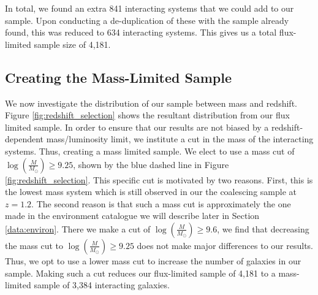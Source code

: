 In total, we found an extra 841 interacting systems that we could add to our sample. Upon conducting a de-duplication of these with the sample already found, this was reduced to 634 interacting systems. This gives us a total flux-limited sample size of 4,181.

\subsection{Creating the Mass-Limited Sample}
\noindent We now investigate the distribution of our sample between mass and redshift. Figure \ref{fig:redshift_selection} shows the resultant distribution from our flux limited sample. In order to ensure that our results are not biased by a redshift-dependent mass/luminosity limit, we institute a cut in the mass of the interacting systems. Thus, creating a mass limited sample. We elect to use a mass cut of $\log(\frac{M}{M_\odot}) \geq 9.25$, shown by the blue dashed line in Figure \ref{fig:redshift_selection}. This specific cut is motivated by two reasons. First, this is the lowest mass system which is still observed in our the coalescing sample at $z = 1.2$. The second reason is that such a mass cut is approximately the one made in the environment catalogue we will describe later in Section \ref{data:environ}. There we make a cut of $\log(\frac{M}{M_\odot}) \geq 9.6$, we find that decreasing the mass cut to $\log(\frac{M}{M_\odot}) \geq 9.25$ does not make major differences to our results. Thus, we opt to use a lower mass cut to increase the number of galaxies in our sample. Making such a cut reduces our flux-limited sample of 4,181 to a mass-limited sample of 3,384 interacting galaxies.

